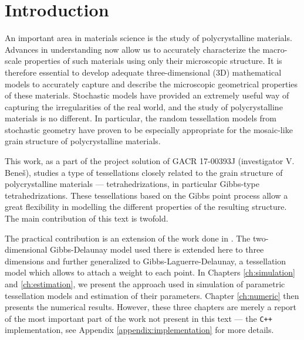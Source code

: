 \chapter*{Introduction}

An important area in materials science is the study of polycrystalline materials. Advances in understanding now allow us to accurately characterize the macro-scale properties of such materials using only their microscopic structure. It is therefore essential to develop adequate three-dimensional (3D) mathematical models to accurately capture and describe the microscopic geometrical properties of these materials. 
Stochastic models have provided an extremely useful way of capturing the irregularities of the real world, and the study of polycrystalline materials is no different. In particular, the random tessellation models from stochastic geometry have proven to be especially appropriate for the mosaic-like grain structure of polycrystalline materials. 

This work, as a part of the project solution of GACR 17-00393J (investigator V. Bene\v{s}), studies a type of tessellations closely related to the grain structure of polycrystalline materials --- tetrahedrizations, in particular Gibbs-type tetrahedrizations. These tessellations based on the Gibbs point process allow a great flexibility in modelling the different properties of the resulting structure. 
The main contribution of this text is twofold. 



The practical contribution is an extension of the work done in \cite{DereudreLavancier2011}. The two-dimensional Gibbs-Delaunay model used there is extended here to three dimensions and further generalized to Gibbs-Laguerre-Delaunay, a tessellation model which allows to attach a weight to each point. In Chapters \ref{ch:simulation} and \ref{ch:estimation}, we present the approach used in simulation of parametric tessellation models and estimation of their parameters. Chapter \ref{ch:numeric} then presents the numerical results. However, these three chapters are merely a report of the most important part of the work not present in this text --- the \texttt{C++} implementation, see Appendix \ref{appendix:implementation} for more details. 

